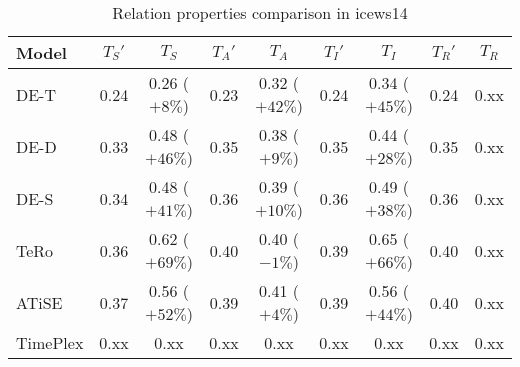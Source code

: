 \begin{table*}[htb]
\centering
\begin{minipage}{0.95\textwidth}
\centering
\caption{Relation properties comparison in icews14}
\vspace{-3mm}

\begin{tabular}{l|cc|cc|cc|cc}\hline
Model       & $T_S'$ & $T_S$ & $T_A'$ & $T_A$ & $T_I'$ & $T_I$ & $T_R'$ & $T_R$ \\ \hline
DE-T & 0.24 & 0.26 (\textcolor{textgreen}{$+8\%$}) & 0.23 & 0.32 (\textcolor{textgreen}{$+42\%$}) & 0.24 & 0.34 (\textcolor{textgreen}{$+45\%$}) & 0.24 & 0.xx \\ 
DE-D & 0.33 & 0.48 (\textcolor{textgreen}{$+46\%$}) & 0.35 & 0.38 (\textcolor{textgreen}{$+9\%$}) & 0.35 & 0.44 (\textcolor{textgreen}{$+28\%$}) & 0.35 & 0.xx \\ 
DE-S & 0.34 & 0.48 (\textcolor{textgreen}{$+41\%$}) & 0.36 & 0.39 (\textcolor{textgreen}{$+10\%$}) & 0.36 & 0.49 (\textcolor{textgreen}{$+38\%$}) & 0.36 & 0.xx \\ 
TeRo & 0.36 & 0.62 (\textcolor{textgreen}{$+69\%$}) & 0.40 & 0.40 (\textcolor{textred}{$-1\%$}) & 0.39 & 0.65 (\textcolor{textgreen}{$+66\%$}) & 0.40 & 0.xx \\ 
ATiSE & 0.37 & 0.56 (\textcolor{textgreen}{$+52\%$}) & 0.39 & 0.41 (\textcolor{textgreen}{$+4\%$}) & 0.39 & 0.56 (\textcolor{textgreen}{$+44\%$}) & 0.40 & 0.xx \\ 
TimePlex & 0.xx & 0.xx & 0.xx & 0.xx & 0.xx & 0.xx & 0.xx & 0.xx \\ 
 \hline
\end{tabular}

\label{fig:relation_properties_icews14_comparison}
\end{minipage}
\end{table*}

